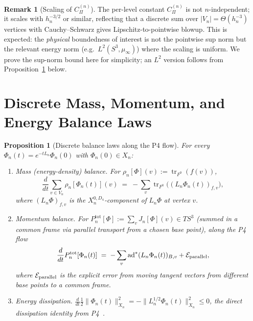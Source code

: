 \documentclass[11pt, a4paper]{amsart}
\newtheorem{proposition}[theorem]{Proposition}
\theoremstyle{definition}
\newtheorem{remark}[theorem]{Remark}
\newcommand{\tr}{\operatorname{tr}}
\begin{document}
\begin{remark}[Scaling of $C_\Pi^{(n)}$]
\label{rmk:Pi-scaling}
The per-level constant $C_\Pi^{(n)}$ is not $n$-independent; it
scales with $h_n^{-3/2}$ or similar, reflecting that a
discrete sum over $|V_n| = \Theta(h_n^{-3})$ vertices with
Cauchy--Schwarz gives Lipschitz-to-pointwise blowup. This is
expected: the \emph{physical} boundedness of interest is not
the pointwise sup norm but the relevant energy norm (e.g.\
$L^2(S^3, \mu_\infty)$) where the scaling is uniform. We prove
the sup-norm bound here for simplicity; an $L^2$ version
follows from Proposition~\ref{prop:balance-laws} below.
\end{remark}

\section{Discrete Mass, Momentum, and Energy Balance Laws}
\label{sec:balance}

\begin{proposition}[Discrete balance laws along the P4 flow]
\label{prop:balance-laws}
For every $\Phi_n(t) = e^{-t L_n} \Phi_n(0)$ with $\Phi_n(0) \in
X_n$:
\begin{enumerate}
\item[\textup{(i)}] \emph{Mass (energy-density) balance.}
  For $\rho_n[\Phi](v) := \tr_{F^0}(f(v))$,
  \[
    \frac{d}{dt} \sum_{v \in V_n} \rho_n[\Phi_n(t)](v)
      \;=\; -\sum_v \tr_{F^0}\bigl((L_n \Phi_n(t))_{f, v}\bigr),
  \]
  where $(L_n \Phi)_{f, v}$ is the $X_n^{0, D_4}$-component of
  $L_n \Phi$ at vertex $v$.
\item[\textup{(ii)}] \emph{Momentum balance.}
  For $P_n^{\mathrm{tot}}[\Phi] := \sum_v J_n[\Phi](v) \in
  T S^3$ (summed in a common frame via parallel transport from
  a chosen base point), along the P4 flow
  \[
    \frac{d}{dt} P_n^{\mathrm{tot}}[\Phi_n(t)]
      \;=\; -\sum_v \mathrm{ad}^{\ast}(L_n \Phi_n(t))_{B, v}
      + \mathcal E_{\rm parallel},
  \]
  where $\mathcal E_{\rm parallel}$ is the explicit error from
  moving tangent vectors from different base points to a common
  frame.
\item[\textup{(iii)}] \emph{Energy dissipation.}
  $\frac{d}{dt} \tfrac{1}{2} \|\Phi_n(t)\|_{X_n}^2
  = -\|L_n^{1/2} \Phi_n(t)\|_{X_n}^2 \leq 0$, the direct
  dissipation identity from P4~\cite[Prop.~5.1]{ClosureDynamics}.
\end{enumerate}
\end{proposition}
\end{document}
